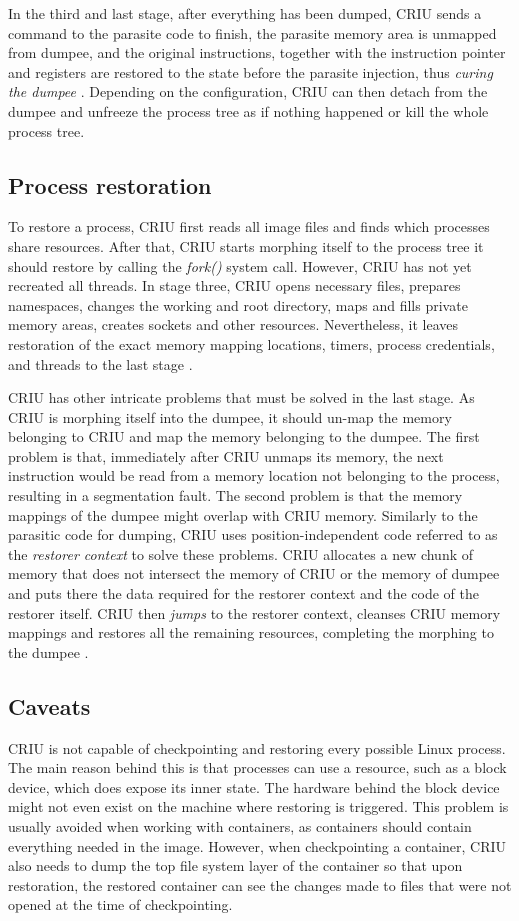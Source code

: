 \documentclass[
  digital,     %
  oneside,     %
  nosansbold,  %
  nocolorbold, %
  lof,         %
  lot,         %
]{fithesis4}
\begin{document}
In the third and last stage, after everything has been dumped, CRIU sends a command to the parasite code to finish, the parasite memory area is unmapped from dumpee, and the original instructions, together with the instruction pointer and registers are restored to the state before the parasite injection, thus \emph{curing the dumpee} \cite{criu_parasite}. Depending on the configuration, CRIU can then detach from the dumpee and unfreeze the process tree as if nothing happened or kill the whole process tree.

\subsection{Process restoration}
To restore a process, CRIU first reads all image files and finds which processes share resources. After that, CRIU starts morphing itself to the process tree it should restore by calling the \emph{fork()} system call. However, CRIU has not yet recreated all threads. In stage three, CRIU opens necessary files, prepares namespaces, changes the working and root directory, maps and fills private memory areas, creates sockets and other resources. Nevertheless, it leaves restoration of the exact memory mapping locations, timers, process credentials, and threads to the last stage \cite{criu_cr}.

CRIU has other intricate problems that must be solved in the last stage. As CRIU is morphing itself into the dumpee, it should un-map the memory belonging to CRIU and map the memory belonging to the dumpee. The first problem is that, immediately after CRIU unmaps its memory, the next instruction would be read from a memory location not belonging to the process, resulting in a segmentation fault. The second problem is that the memory mappings of the dumpee might overlap with CRIU memory. Similarly to the parasitic code for dumping, CRIU uses position-independent code referred to as the \emph{restorer context} to solve these problems. CRIU allocates a new chunk of memory that does not intersect the memory of CRIU or the memory of dumpee and puts there the data required for the restorer context and the code of the restorer itself. CRIU then \emph{jumps} to the restorer context, cleanses CRIU memory mappings and restores all the remaining resources, completing the morphing to the dumpee \cite{criu_restorer}.


\subsection{Caveats}
CRIU is not capable of checkpointing and restoring every possible Linux process. The main reason behind this is that processes can use a resource, such as a block device, which does expose its inner state. The hardware behind the block device might not even exist on the machine where restoring is triggered. This problem is usually avoided when working with containers, as containers should contain everything needed in the image. However, when checkpointing a container, CRIU also needs to dump the top file system layer of the container so that upon restoration, the restored container can see the changes made to files that were not opened at the time of checkpointing.
\end{document}
